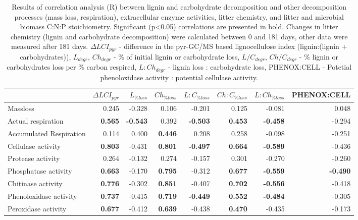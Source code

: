 \documentclass[10pt]{article}
\begin{document}
\begin{flushleft}
\begin{landscape}
\begin{table}[h!]
\centering
\caption{Results of correlation analysis (R) between lignin and carbohydrate decomposition and other decomposition processes (mass loss, respiration), extracellular enzyme activities, litter chemistry, and litter and microbial biomass C:N:P stoichiometry. Significant (p\textless 0.05) correlations are presented in bold. Changes in litter chemistry (lignin and carbohydrate decomposition) were calculated between 0 and 181 days, other data were measured after 181 days. $\Delta LCI_{pyr}$ - difference in the pyr-GC/MS based lignocellulose index (lignin:(lignin + carbohydrates)), $L_{degr}$, $Ch_{degr}$ - \% of initial lignin or carbohydrate loss, $L/C_{degr}$, $Ch/C_{degr}$  - \% lignin or carbohydrates loss per \% carbon respired, $L:Ch_{degr}$ - lignin loss : carbohydrate loss, PHENOX:CELL - Potetial phenoloxidase activity : potential cellulase activity.} 
\label{corrtable}
{\small
\begin{tabular}{lrrrrrrr}
  \hline
 & $\Delta LCI_{pyr}$ & $L_{\%loss}$ & $Ch_{\%loss}$ & $L:C_{\%loss}$ & $Ch:C_{\%loss}$ & $L:Ch_{\%loss}$ & PHENOX:CELL \\ 
  \hline
Massloss & 0.245 & -0.328 & 0.106 & -0.201 & 0.125 & -0.081 & 0.048 \\ 
  Actual respiration & \textbf{ 0.565 } & \textbf{ -0.543 } & 0.392 & \textbf{ -0.503 } & \textbf{ 0.453 } & \textbf{ -0.458 } & -0.294 \\ 
  Accumulated Respiration & 0.114 & 0.400 & \textbf{ 0.446 } & 0.208 & 0.258 & -0.098 & -0.251 \\ 
  Cellulase activity & \textbf{ 0.803 } & -0.431 & \textbf{ 0.801 } & \textbf{ -0.497 } & \textbf{ 0.664 } & \textbf{ -0.589 } & -0.436 \\ 
  Protease activity & 0.264 & -0.132 & 0.274 & -0.157 & 0.301 & -0.270 & -0.260 \\ 
  Phosphatase activity & \textbf{ 0.663 } & -0.170 & \textbf{ 0.795 } & -0.312 & \textbf{ 0.677 } & \textbf{ -0.559 } & \textbf{ -0.490 } \\ 
  Chitinase activity & \textbf{ 0.776 } & -0.302 & \textbf{ 0.851 } & -0.407 & \textbf{ 0.702 } & \textbf{ -0.556 } & -0.418 \\ 
  Phenoloxidase activity & \textbf{ 0.737 } & -0.415 & \textbf{ 0.719 } & \textbf{ -0.449 } & \textbf{ 0.552 } & \textbf{ -0.484 } & -0.305 \\ 
  Peroxidase activity & \textbf{ 0.677 } & -0.412 & \textbf{ 0.639 } & -0.438 & \textbf{ 0.470 } & -0.435 & -0.173 \\ 

\end{tabular}}
\end{table}
\end{landscape}
\end{flushleft}
\end{document}
